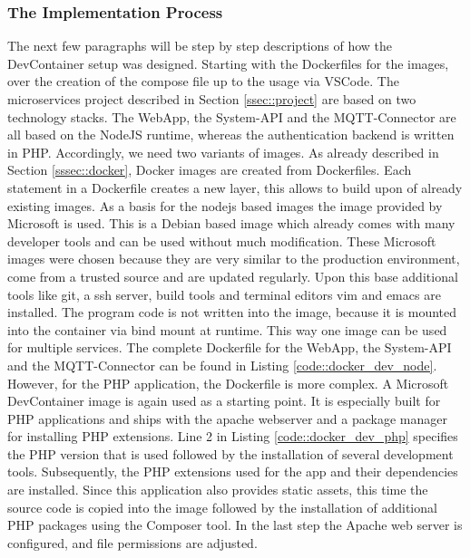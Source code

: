 \documentclass[12pt, a4paper]{article}
\begin{document}
        \subsubsection{The Implementation Process}\label{ssec::imp_process}
        The next few paragraphs will be step by step descriptions of how the DevContainer setup was designed. Starting with the Dockerfiles for the images, over the creation of the compose file up to the usage via \ac{VSCode}.
        The microservices project described in Section \ref{ssec::project} are based on two technology stacks. The WebApp, the System-API and the MQTT-Connector are all based on the NodeJS runtime, whereas the authentication backend is written in PHP. Accordingly, we need two variants of images. As already described in Section \ref{sssec::docker}, Docker images are created from Dockerfiles. Each statement in a Dockerfile creates a new layer, this allows to build upon of already existing images.\newline
        As a basis for the nodejs based images the  image provided by Microsoft is used. This is a Debian based image which already comes with many developer tools and can be used without much modification. These Microsoft images were chosen because they are very similar to the production environment, come from a trusted source and are updated regularly. Upon this base additional tools like git, a ssh server, build tools and terminal editors vim and emacs are installed. The program code is not written into the image, because it is mounted into the container via bind mount at runtime. This way one image can be used for multiple services. The complete Dockerfile for the WebApp, the System-\ac{API} and the MQTT-Connector can be found in Listing \ref{code::docker_dev_node}.\newline
        However, for the PHP application, the Dockerfile is more complex. A Microsoft DevContainer image is again used as a starting point. It is especially built for PHP applications and ships with the apache webserver and a package manager for installing PHP extensions. Line 2 in Listing \ref{code::docker_dev_php} specifies the PHP version that is used followed by the installation of several development tools. Subsequently, the PHP extensions used for the app and their dependencies are installed. Since this application also provides static assets, this time the source code is copied into the image followed by the installation of additional PHP packages using the Composer tool. In the last step the Apache web server is configured, and file permissions are adjusted. \newline
\end{document}
